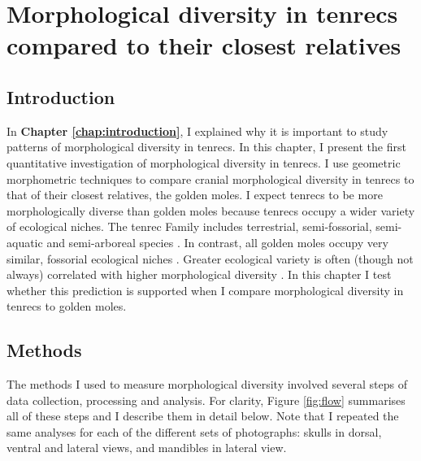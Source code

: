\chapter{Morphological diversity in tenrecs compared to their closest relatives}
\label{chap:disparity}


\section{Introduction}
	In \textbf{Chapter \ref{chap:introduction}}, I explained why it is important to study patterns of morphological diversity in tenrecs. In this chapter, I present the first quantitative investigation of morphological diversity in tenrecs. I use geometric morphometric techniques \citep{Rohlf1993} to compare cranial morphological diversity in tenrecs to that of their closest relatives, the golden moles. 
	I expect tenrecs to be more morphologically diverse than golden moles because tenrecs occupy a wider variety of ecological niches. The tenrec Family includes terrestrial, semi-fossorial, semi-aquatic and semi-arboreal species \citep{Soarimalala2011}. In contrast, all golden moles occupy very similar, fossorial ecological niches \citep{Bronner1995}. 
	Greater ecological variety is often (though not always) correlated with higher morphological diversity \citep{Losos2010a}. In this chapter I test whether this prediction is supported when I compare morphological diversity in tenrecs to golden moles.

\section{Methods}

	The methods I used to measure morphological diversity involved several steps of data collection, processing and analysis. For clarity,  Figure \ref{fig:flow} summarises all of these steps and I describe them in detail below. Note that I repeated the same analyses for each of the different sets of photographs: skulls in dorsal, ventral and lateral views, and mandibles in lateral view.
	
